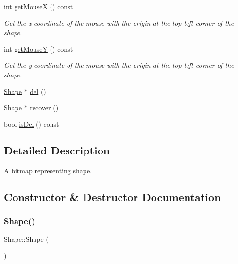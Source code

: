 \begin{DoxyCompactItemize}
int \mbox{\hyperlink{class_shape_aef8956ea2a795d59df6fad328b0b85b8}{get\+MouseX}} () const
\begin{DoxyCompactList}\small\item\em Get the x coordinate of the mouse with the origin at the top-\/left corner of the shape. \end{DoxyCompactList}\item 
int \mbox{\hyperlink{class_shape_a7e4e469fca3e49bd2836a9a2798f14a1}{get\+MouseY}} () const
\begin{DoxyCompactList}\small\item\em Get the y coordinate of the mouse with the origin at the top-\/left corner of the shape. \end{DoxyCompactList}\item 
\mbox{\hyperlink{class_shape}{Shape}} $\ast$ \mbox{\hyperlink{class_shape_a592b3cd82e09faba98018ff8498dd411}{del}} ()
\item 
\mbox{\hyperlink{class_shape}{Shape}} $\ast$ \mbox{\hyperlink{class_shape_aba906e02eb04a0b82caab679715204a7}{recover}} ()
\item 
bool \mbox{\hyperlink{class_shape_ab93f2288cad70553ecdaf61ae9b17533}{is\+Del}} () const
\end{DoxyCompactItemize}


\subsection{Detailed Description}
A bitmap representing shape. 

\subsection{Constructor \& Destructor Documentation}
\mbox{\label{class_shape_aaa8d87171e65e0d8ba3c5459978992a7}} 
\subsubsection{\texorpdfstring{Shape()}{Shape()}\hspace{0.1cm}{\footnotesize\ttfamily [1/3]}}
{\footnotesize\ttfamily Shape\+::\+Shape (\begin{DoxyParamCaption}{ }\end{DoxyParamCaption})\hspace{0.3cm}{\ttfamily [inline]}}




